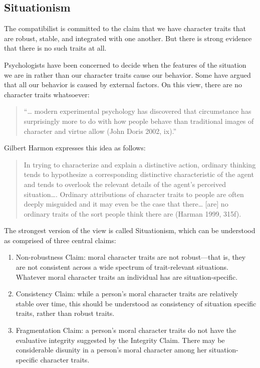 \documentclass[]{article}
\begin{document}
\subsection{Situationism}\label{situationism}

The compatibilist is committed to the claim that we have character
traits that are robust, stable, and integrated with one another. But
there is strong evidence that there is no such traits at all.

Psychologists have been concerned to decide when the features of the
situation we are in rather than our character traits cause our behavior.
Some have argued that all our behavior is caused by external factors. On
this view, there are no character traits whatsoever:

\begin{quote}
``\ldots{} modern experimental psychology has discovered that
circumstance has surprisingly more to do with how people behave than
traditional images of character and virtue allow (John Doris 2002,
ix).''
\end{quote}

Gilbert Harmon expresses this idea as follows:

\begin{quote}
In trying to characterize and explain a distinctive action, ordinary
thinking tends to hypothesize a corresponding distinctive characteristic
of the agent and tends to overlook the relevant details of the agent's
perceived situation\ldots{}. Ordinary attributions of character traits
to people are often deeply misguided and it may even be the case that
there\ldots{} {[}are{]} no ordinary traits of the sort people think
there are (Harman 1999, 315f).
\end{quote}

The strongest version of the view is called Situationism, which can be
understood as comprised of three central claims:

\begin{enumerate}
\def\labelenumi{\arabic{enumi}.}
\itemsep1pt\parskip0pt
\item
  Non-robustness Claim: moral character traits are not robust---that is,
  they are not consistent across a wide spectrum of trait-relevant
  situations. Whatever moral character traits an individual has are
  situation-specific.
\item
  Consistency Claim: while a person's moral character traits are
  relatively stable over time, this should be understood as consistency
  of situation specific traits, rather than robust traits.
\item
  Fragmentation Claim: a person's moral character traits do not have the
  evaluative integrity suggested by the Integrity Claim. There may be
  considerable disunity in a person's moral character among her
  situation-specific character traits.
\end{enumerate}
\end{document}
